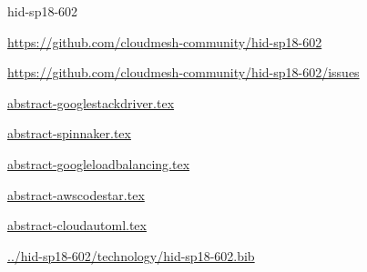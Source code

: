 \begin{IU}

hid-sp18-602

\url{https://github.com/cloudmesh-community/hid-sp18-602}

\url{https://github.com/cloudmesh-community/hid-sp18-602/issues}

\href{https://github.com/cloudmesh-community/hid-sp18-602/blob/master//technology/abstract-googlestackdriver.tex}{abstract-googlestackdriver.tex}

\href{https://github.com/cloudmesh-community/hid-sp18-602/blob/master//technology/abstract-spinnaker.tex}{abstract-spinnaker.tex}

\href{https://github.com/cloudmesh-community/hid-sp18-602/blob/master//technology/abstract-googleloadbalancing.tex}{abstract-googleloadbalancing.tex}

\href{https://github.com/cloudmesh-community/hid-sp18-602/blob/master//technology/abstract-awscodestar.tex}{abstract-awscodestar.tex}

\href{https://github.com/cloudmesh-community/hid-sp18-602/blob/master//technology/abstract-cloudautoml.tex}{abstract-cloudautoml.tex}

\href{https://github.com/cloudmesh-community/hid-sp18-602/blob/master//technology/hid-sp18-602.bib}{../hid-sp18-602/technology/hid-sp18-602.bib}

\end{IU}
